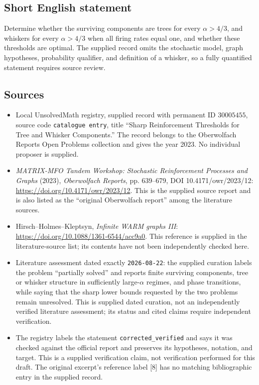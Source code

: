 \documentclass[11pt]{article}
\begin{document}
\subsection{Short English statement}
Determine whether the surviving components are trees for every \(\alpha>4/3\), and whiskers for every \(\alpha>4/3\) when all firing rates equal one, and whether these thresholds are optimal. The supplied record omits the stochastic model, graph hypotheses, probability qualifier, and definition of a whisker, so a fully quantified statement requires source review.
\subsection{Sources}
\begin{itemize}
\item Local UnsolvedMath registry, supplied record with permanent ID \(30005455\), source code \texttt{catalogue entry}, title ``Sharp Reinforcement Thresholds for Tree and Whisker Components.'' The record belongs to the Oberwolfach Reports Open Problems collection and gives the year 2023. No individual proposer is supplied.
\item \emph{MATRIX-MFO Tandem Workshop: Stochastic Reinforcement Processes and Graphs} (2023), \emph{Oberwolfach Reports}, pp. 639--679, DOI 10.4171/owr/2023/12: \url{https://doi.org/10.4171/owr/2023/12}. This is the supplied source report and is also listed as the ``original Oberwolfach report'' among the literature sources.
\item Hirsch--Holmes--Kleptsyn, \emph{Infinite WARM graphs III}: \url{https://doi.org/10.1088/1361-6544/acc9a0}. This reference is supplied in the literature-source list; its contents have not been independently checked here.
\item Literature assessment dated exactly \texttt{2026-08-22}: the supplied curation labels the problem ``partially solved'' and reports finite surviving components, tree or whisker structure in sufficiently large-\(\alpha\) regimes, and phase transitions, while saying that the sharp lower bounds requested by the two problems remain unresolved. This is supplied dated curation, not an independently verified literature assessment; its status and cited claims require independent verification.
\item The registry labels the statement \texttt{corrected\_verified} and says it was checked against the official report and preserves its hypotheses, notation, and target. This is a supplied verification claim, not verification performed for this draft. The original excerpt's reference label [8] has no matching bibliographic entry in the supplied record.
\end{itemize}
\end{document}
